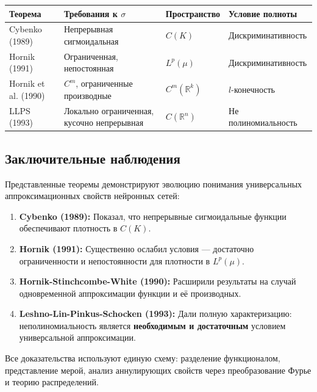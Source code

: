 \documentclass[../NDCNNAI_main.tex]{subfiles}
\begin{document}
\begin{center}
\small 
\begin{tabularx}{\textwidth}{|>{\raggedright\arraybackslash}X|>{\raggedright\arraybackslash}X|>{\raggedright\arraybackslash}X|>{\raggedright\arraybackslash}X|}
\hline
\textbf{Теорема} & \textbf{Требования к $\sigma$} & \textbf{Пространство} & \textbf{Условие полноты} \\
\hline
Cybenko (1989) & Непрерывная сигмоидальная & $C(K)$ & Дискриминативность \\
\hline
Hornik (1991) & Ограниченная, непостоянная & $L^p(\mu)$ & Дискриминативность \\
\hline
Hornik et al. (1990) & $C^m$, ограниченные производные & $C^m(\mathbb{R}^k)$ & $l$-конечность \\
\hline
LLPS (1993) & Локально ограниченная, кусочно непрерывная & $C(\mathbb{R}^n)$ & Не полиномиальность \\
\hline
\end{tabularx}
\end{center}

\subsection{Заключительные наблюдения}

Представленные теоремы демонстрируют эволюцию понимания универсальных аппроксимационных свойств нейронных сетей:

\begin{enumerate}
    \item \textbf{Cybenko (1989):} Показал, что непрерывные сигмоидальные функции обеспечивают плотность в $C(K)$.
    \item \textbf{Hornik (1991):} Существенно ослабил условия --- достаточно ограниченности и непостоянности для плотности в $L^p(\mu)$.
    \item \textbf{Hornik-Stinchcombe-White (1990):} Расширили результаты на случай одновременной аппроксимации функции и её производных.
    \item \textbf{Leshno-Lin-Pinkus-Schocken (1993):} Дали полную характеризацию: неполиномиальность является \textbf{необходимым и достаточным} условием универсальной аппроксимации.
\end{enumerate}

Все доказательства используют единую схему: разделение функционалом, представление мерой, анализ аннулирующих свойств через преобразование Фурье и теорию распределений.
\end{document}
